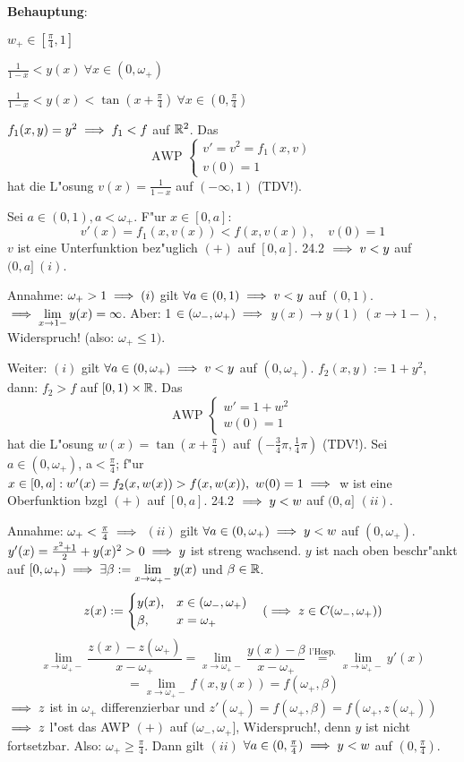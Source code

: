 \documentclass[a4paper,twoside,DIV15,BCOR12mm]{scrbook}
\begin{document}
\textbf{Behauptung}:\begin{liste}
	\item $w_+\in[\frac{\pi}{4},1]$
	\item $\frac{1}{1-x}<y(x)\ \forall x\in(0,\omega_+)$
	\item $\frac{1}{1-x}<y(x)<\tan(x+\frac{\pi}{4})\ \forall x\in(0,\frac{\pi}{4})$
\end{liste}
\begin{beweis}
$f_1(x,y)=y^2\implies f_1<f$ auf $\mathbb{R}^2$. Das
\[
	\text{AWP }\begin{cases}
		v'=v^2=f_1(x,v)\\
		v(0)=1
	\end{cases}
\]
hat die L"osung $v(x)=\frac{1}{1-x}$ auf $(-\infty, 1)$ (TDV!).
\end{beweis}
Sei $a\in (0,1), a<\omega_+$. F"ur $x\in[0,a]$:
\[
	v'(x)=f_1(x, v(x)) < f(x,v(x)),\quad v(0)=1
\]
$v$ ist eine Unterfunktion bez"uglich $(+)$ auf $[0,a]$. 24.2 $\implies v<y$ auf $(0,a]\ (i)$.

Annahme: $\omega_+>1\implies (i)$ gilt $\forall a\in(0,1)\implies v<y$ auf $(0,1)$.
$\implies \displaystyle\lim_{x\to 1-}y(x)=\infty$. Aber: 1 $\in (\omega_-,\omega_+)\implies$
$y(x)\to y(1)\ (x\to 1-)$, Widerspruch! (also: $\omega_+\le 1)$.

Weiter: $(i)$ gilt $\forall a\in (0,\omega_+)\implies v<y$ auf $(0,\omega_+)$. 
$f_2(x,y):=1+y^2$, dann: $f_2>f$ auf $[0,1)\times\mathbb{R}$. Das
\[
	\text{AWP }\begin{cases}
		w'=1+w^2\\
		w(0)=1
	\end{cases}
\]
hat die L"osung $w(x)=\tan(x+\frac{\pi}{4})$ auf $(-\frac{3}{4}\pi,\frac{1}{4}\pi)$ (TDV!).
Sei $a\in (0,\omega_+)$, a$<\frac{\pi}{4}$; f"ur $x\in [0,a]: w'(x)=f_2(x,w(x))>f(x,w(x)),\ 
w(0)=1\folgt$ w ist eine Oberfunktion bzgl $(+)$ auf $[0,a]$. 24.2 $\implies y<w$ auf $(0,a]$ $(ii)$.

Annahme: $\omega_+ < \frac{\pi}{4}\implies$ $(ii)$ gilt $\forall a\in (0,\omega_+)\implies
y<w$ auf $(0,\omega_+)$. $y'(x)=\frac{x^2+1}{2}+y(x)^2>0\implies y$ ist streng wachsend. $y$ ist
nach oben beschr"ankt auf $[0,\omega_+) \implies \exists \beta:=\displaystyle\lim_{x\to\omega_+-}y(x)$ und
$\beta\in\mathbb{R}$.
\[
	z(x):=\begin{cases}
		y(x),& x\in (\omega_-, \omega_+)\\
		\beta,& x=\omega_+
	\end{cases}
	\quad (\implies z\in C(\omega_-,\omega_+))
\]
\[
	\lim_{x\to\omega_+-}\frac{z(x)-z(\omega_+)}{x-\omega_+}=\lim_{x\to\omega_+-}\frac{y(x)-\beta}{x-\omega_+}
	\overset{\text{l'Hosp.}}{=}\lim_{x\to\omega_+-}y'(x)
\]
\[
	= \lim_{x\to\omega_+-}f(x,y(x))=f(\omega_+, \beta)
\]
$\implies z$ ist in $\omega_+$ differenzierbar und $z'(\omega_+)=f(\omega_+,\beta)=f(\omega_+,z(\omega_+))$
$\implies z$ l"ost das AWP $(+)$ auf $(\omega_-,\omega_+]$, Widerspruch!, denn $y$ ist nicht fortsetzbar.
Also: $\omega_+\ge\frac{\pi}{4}$. Dann gilt $(ii)$ $\forall a\in (0,\frac{\pi}{4})\implies y<w$ auf $(0,\frac{\pi}{4})$.
\end{document}
